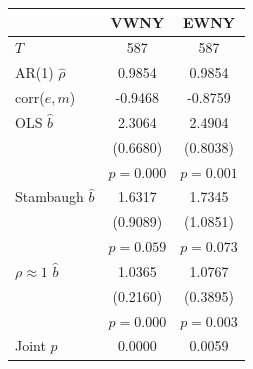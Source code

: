 \begin{tabular}{lcc}
\toprule
 & VWNY & EWNY \\
\midrule
$T$ & 587 & 587 \\
AR(1) $\hat\rho$ & 0.9854 & 0.9854 \\
corr($e,m$) & -0.9468 & -0.8759 \\
\midrule
OLS $\hat b$ & 2.3064 & 2.4904 \\
 & (0.6680) & (0.8038) \\
 & $p=0.000$ & $p=0.001$ \\
Stambaugh $\hat b$ & 1.6317 & 1.7345 \\
 & (0.9089) & (1.0851) \\
 & $p=0.059$ & $p=0.073$ \\
$\rho\approx1$ $\hat b$ & 1.0365 & 1.0767 \\
 & (0.2160) & (0.3895) \\
 & $p=0.000$ & $p=0.003$ \\
\midrule
Joint $p$ & 0.0000 & 0.0059 \\
\bottomrule
\end{tabular}
